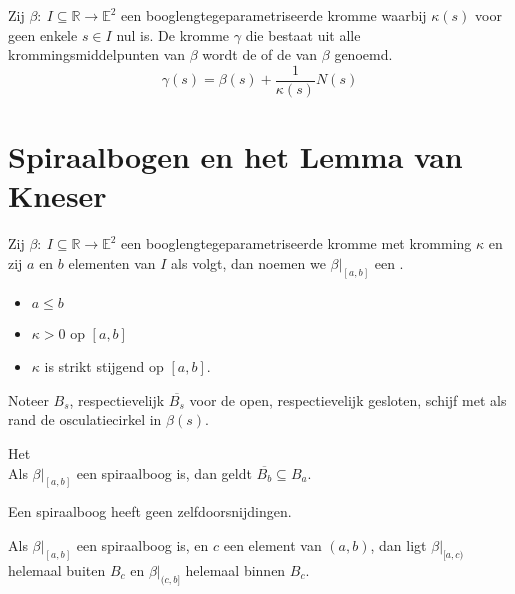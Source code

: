 \documentclass[main.tex]{subfiles}
\begin{document}
\begin{de}
  Zij $\beta:\ I \subseteq \mathbb{R} \rightarrow \mathbb{E}^{2}$ een booglengtegeparametriseerde kromme waarbij $\kappa(s)$ voor geen enkele $s\in I$ nul is.
  De kromme $\gamma$ die bestaat uit alle krommingsmiddelpunten van $\beta$ wordt de  of de  van $\beta$ genoemd.
  \[ \gamma(s) = \beta(s) + \frac{1}{\kappa(s)}N(s) \]
\end{de}

\section{Spiraalbogen en het Lemma van Kneser}
\label{sec:spiraalbogen-en-het}

\begin{de}
  Zij $\beta:\ I \subseteq \mathbb{R} \rightarrow \mathbb{E}^{2}$ een booglengtegeparametriseerde kromme met kromming $\kappa$ en zij $a$ en $b$ elementen van $I$ als volgt, dan noemen we $\beta|_{[a,b]}$ een .
  \begin{itemize}
  \item $a \le b$
  \item $\kappa > 0$ op $[a,b]$
  \item $\kappa$ is strikt stijgend op $[a,b]$.
  \end{itemize}
\end{de}

\begin{de}
  Noteer $B_{s}$, respectievelijk $\overline{B_{s}}$ voor de open, respectievelijk gesloten, schijf met als rand de osculatiecirkel in $\beta(s)$.
\end{de}

\begin{lem}
  Het \\
  Als $\beta|_{[a,b]}$ een spiraalboog is, dan geldt $\overline{B_{b}} \subseteq B_{a}$.
\end{lem}

\begin{st}
  Een spiraalboog heeft geen zelfdoorsnijdingen.
\end{st}

\begin{st}
  Als $\beta|_{[a,b]}$ een spiraalboog is, en $c$ een element van $(a,b)$, dan ligt $\beta|_{[a,c)}$ helemaal buiten $B_{c}$ en $\beta|_{(c,b]}$ helemaal binnen $B_{c}$.
\end{st}
\end{document}
